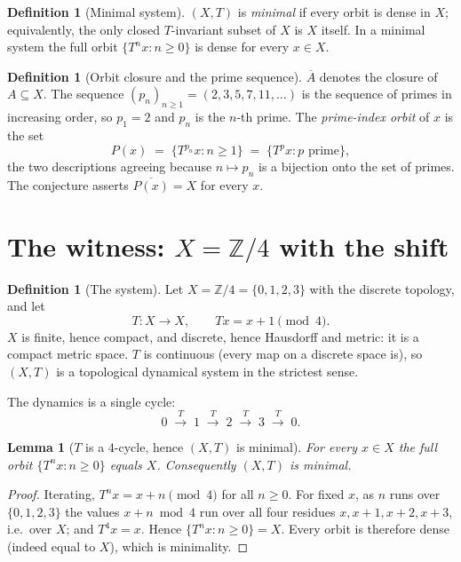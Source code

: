 \documentclass[11pt]{article}
\newtheorem{lemma}[theorem]{Lemma}
\theoremstyle{definition}
\newtheorem{definition}[theorem]{Definition}
\theoremstyle{remark}
\newcommand{\Z}{\mathbb{Z}}
\begin{document}
\begin{definition}[Minimal system]
$(X,T)$ is \emph{minimal} if every orbit is dense in $X$; equivalently, the
only closed $T$-invariant subset of $X$ is $X$ itself. In a minimal system the
full orbit $\{T^n x : n \ge 0\}$ is dense for every $x \in X$.
\end{definition}

\begin{definition}[Orbit closure and the prime sequence]
$\overline{A}$ denotes the closure of $A \subseteq X$. The sequence
$(p_n)_{n\ge 1} = (2, 3, 5, 7, 11, \dots)$ is the sequence of primes in
increasing order, so $p_1 = 2$ and $p_n$ is the $n$-th prime. The
\emph{prime-index orbit} of $x$ is the set
\[
P(x) \;=\; \{T^{p_n}x : n \ge 1\} \;=\; \{T^{p}x : p \text{ prime}\},
\]
the two descriptions agreeing because $n \mapsto p_n$ is a bijection onto the
set of primes. The conjecture asserts $\overline{P(x)} = X$ for every $x$.
\end{definition}

\section{The witness: $X = \Z/4$ with the shift}

\begin{definition}[The system]
Let $X = \Z/4 = \{0,1,2,3\}$ with the discrete topology, and let
\[
T : X \to X, \qquad T x = x + 1 \pmod 4 .
\]
$X$ is finite, hence compact, and discrete, hence Hausdorff and metric: it is
a compact metric space. $T$ is continuous (every map on a discrete space is),
so $(X,T)$ is a topological dynamical system in the strictest sense.
\end{definition}

The dynamics is a single cycle:
\[
0 \;\xrightarrow{\;T\;}\; 1 \;\xrightarrow{\;T\;}\; 2
\;\xrightarrow{\;T\;}\; 3 \;\xrightarrow{\;T\;}\; 0 .
\]

\begin{lemma}[$T$ is a $4$-cycle, hence $(X,T)$ is minimal]
\label{lem:minimal}
For every $x \in X$ the full orbit $\{T^n x : n \ge 0\}$ equals $X$.
Consequently $(X,T)$ is minimal.
\end{lemma}

\begin{proof}
Iterating, $T^n x = x + n \pmod 4$ for all $n \ge 0$. For fixed $x$, as $n$
runs over $\{0,1,2,3\}$ the values $x+n \bmod 4$ run over all four residues
$x, x+1, x+2, x+3$, i.e.\ over $X$; and $T^4 x = x$. Hence
$\{T^n x : n \ge 0\} = X$. Every orbit is therefore dense (indeed equal to
$X$), which is minimality.
\end{proof}
\end{document}
